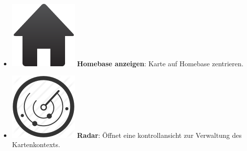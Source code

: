 \begin{itemize}[leftmargin=*,noitemsep,topsep=1ex,parsep=0pt,partopsep=0pt]
\item \includegraphics[scale=0.15]{bilder/icons/home.png} \textbf{Homebase anzeigen}: Karte auf Homebase zentrieren.
\item \includegraphics[scale=0.15]{bilder/icons/radar.png} \textbf{Radar}: Öffnet eine kontrollansicht zur Verwaltung des Kartenkontexts.
\end{itemize}

